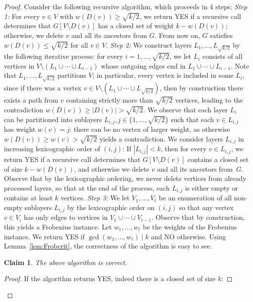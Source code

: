 \documentclass[10pt,a4paper]{article}
\newtheorem{claim}[thm]{Claim}
\newcommand{\divides}{\mid}
\begin{document}
\begin{proof}
Consider the following recursive algorithm, which proceeds in 4 steps:
%
\emph{Step 1:} For every $v\in V$ with $w(D(v)) \ge \sqrt{k/2}$, we return YES if a recursive call determines that $G[V \setminus D(v)]$ has a closed set of weight $k-w(D(v))$; otherwise, we delete $v$ and all its ancestors from $G$. From now on, $G$ satisfies $w(D(v)) \le \sqrt{k/2}$ for all $v\in V$.
%
\emph{Step 2:} We construct layers $L_1, \dots, L_{\sqrt{k/2}}$ by the following iterative process: for every $i=1, \dots, \sqrt{k/2}$, we let $L_i$ consists of all vertices in $V\setminus (L_1 \cup \cdots \cup L_{i-1})$ whose outgoing edges end in $L_1\cup \cdots \cup L_{i-1}$. Note that $L_1, \dots, L_{\sqrt{k/2}}$ partitions $V$; in particular, every vertex is included in some $L_i$, since if there was a vertex $v\in V\setminus (L_1 \cup \cdots \cup L_{\sqrt{k/2}})$, then by construction there exists a path from $v$ containing strictly more than $\sqrt{k/2}$ vertices, leading to the contradiction $w(D(v))\ge |D(v)| > \sqrt{k/2}$. 
%
We observe that each layer $L_i$ can be partitioned into sublayers $L_{i,j}, j\in \{1, \dots, \sqrt{k/2}\}$ such that each $v\in L_{i,j}$ has weight $w(v) = j$: there can be no vertex of larger weight, as otherwise $w(D(v)) \ge w(v) > \sqrt{k/2}$ yields a contradiction. We consider layers $L_{i,j}$ in increasing lexicographic order of $(i,j)$: If $|L_{i,j}| < k$, then for every $v\in L_{i,j}$, we return YES if a recursive call determines that $G[V\setminus D(v)]$ contains a closed set of size $k-w(D(v))$, and otherwise we delete $v$ and all its ancestors from~$G$. Observe that by the lexicographic ordering, we never delete vertices from already processed layers, so that at the end of the process, each $L_{i,j}$ is either empty or contains at least $k$ vertices. 
%
\emph{Step 3:} We let $V_1, \dots, V_\ell$ be an enumeration of all non-empty sublayers $L_{i,j}$ by the lexicographic order on $(i,j)$ so that any vertex $v\in V_{i}$ has only edges to vertices in $V_1 \cup \cdots \cup V_{i-1}$. Observe that by construction, this yields a Frobenius instance. Let $w_1,\dots, w_\ell$ be the weights of the Frobenius instance. We return YES if $\gcd(w_1,\dots, w_\ell) \divides k$ and NO otherwise. 
%
Using Lemma~\ref{lem:Frobcrit}, the correctness of the algorithm is easy to see.
%
\begin{claim}\label{cl:imp1}
The above algorithm is correct.
\end{claim}
\begin{proof}
If the algorithm returns YES, indeed there is a closed set of size $k$: 

\end{proof}
\end{proof}
\end{document}
